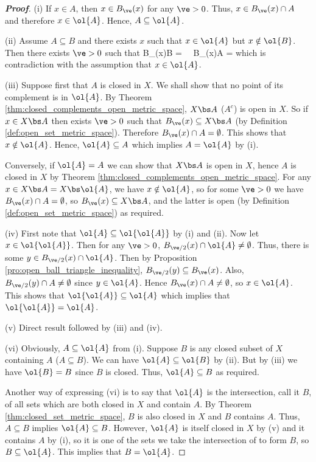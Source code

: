 \begin{proof}[\bf Proof]
\ben
\item [(i)] If $x\in A$, then $x\in B_\ve(x)$ for any $\ve>0$. Thus, $x\in B_\ve(x) \cap A$ and therefore $x\in \ol{A}$. Hence, $A\subseteq \ol{A}$.

\item [(ii)] Assume $A\subseteq B$ and there exists $x$ such that $x\in \ol{A}$ but $x\notin \ol{B}$. Then there exists $\ve>0$ such that
\be
B_\ve(x)\cap B = \emptyset\ \ra\ B_\ve(x)\cap A = \emptyset
\ee
which is contradiction with the assumption that $x\in \ol{A}$.

\item [(iii)] Suppose first that $A$ is closed in $X$. We shall show that no point of its complement is in $\ol{A}$. By Theorem \ref{thm:closed_complements_open_metric_space}, $X\bs A$ ($A^c$) is open in $X$. So if $x\in X\bs A$ then exists $\ve>0$ such that $B_\ve(x) \subseteq X\bs A$ (by Definition \ref{def:open_set_metric_space}). Therefore $B_{\ve}(x)\cap A = \emptyset$. This shows that $x\notin \ol{A}$. Hence, $\ol{A}\subseteq A$ which implies $A=\ol{A}$ by (i).

Conversely, if $\ol{A} = A$ we can show that $X\bs A$ is open in $X$, hence $A$ is closed in $X$ by Theorem \ref{thm:closed_complements_open_metric_space}. For any $x\in X\bs A = X\bs \ol{A}$, we have $x\notin \ol{A}$, so for some $\ve>0$ we have $B_\ve(x)\cap A = \emptyset$, so $B_\ve(x) \subseteq X\bs A$, and the latter is open (by Definition \ref{def:open_set_metric_space}) as required.

\item [(iv)] First note that $\ol{A} \subseteq \ol{\ol{A}}$ by (i) and (ii). Now let $x\in \ol{\ol{A}}$. Then for any $\ve >0$, $B_{\ve/2}(x) \cap \ol{A} \neq \emptyset$. Thus, there is some $y\in B_{\ve/2}(x) \cap \ol{A}$. Then by Proposition \ref{pro:open_ball_triangle_inequality}, $B_{\ve/2}(y) \subseteq B_\ve(x)$. Also, $B_{\ve/2}(y) \cap A \neq \emptyset$ since $y\in \ol{A}$. Hence $B_{\ve}(x) \cap A \neq \emptyset$, so $x\in \ol{A}$. This shows that $\ol{\ol{A}} \subseteq \ol{A}$ which implies that $\ol{\ol{A}} = \ol{A}$.

\item [(v)] Direct result followed by (iii) and (iv).

\item [(vi)] Obviously, $A\subseteq \ol{A}$ from (i). Suppose $B$ is any closed subset of $X$ containing $A$ ($A\subseteq B$). We can have $\ol{A}\subseteq \ol{B}$ by (ii). But by (iii) we have $\ol{B} = B$ since $B$ is closed. Thus, $\ol{A}\subseteq B$ as required.

Another way of expressing (vi) is to say that $\ol{A}$ is the intersection, call it $B$, of all sets which are both closed in $X$ and contain $A$. By Theorem \ref{thm:closed_set_metric_space}, $B$ is also closed in $X$ and $B$ contains $A$. Thus, $A\subseteq B$ implies $\ol{A} \subseteq B$. However, $\ol{A}$ is itself closed in $X$ by (v) and it contains $A$ by (i), so it is one of the sets we take the intersection of to form $B$, so $B\subseteq \ol{A}$. This implies that $B = \ol{A}$. 
\een
\end{proof}



